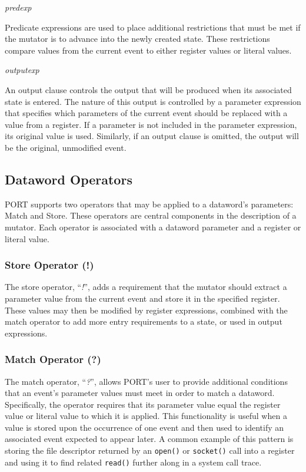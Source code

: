 \textit{predexp}

Predicate expressions are used to place additional restrictions that must
be met if the mutator is to advance into the newly created state.  These
restrictions compare values from the current event to either register
values or literal values.

\textit{outputexp}

An output clause controls the output that will be produced when its
associated state is entered.  The nature of this output is controlled by a
parameter expression that specifies which parameters of the current event
should be replaced with a value from a register.  If a parameter is not
included in the parameter expression, its original value is used.
Similarly,
if an output clause is omitted, the output will be the
original, unmodified event.

\subsection{Dataword Operators}
\label{sub:DatawordOperators}

PORT supports two operators that may be applied to a dataword's
parameters: Match and Store.  These operators are central components in
the description of a mutator.  Each operator is associated with a dataword
parameter and a register or literal value.

\subsubsection{Store Operator (!)}

The store operator, ``\textit{!}'', adds a requirement that the
mutator should extract a parameter value from the current event and store
it in the specified register.  These values may then be modified by
register expressions, combined with the match operator to add more
entry requirements to a state, or used in output expressions.

\subsubsection{Match Operator (?)}

The match operator, ``\textit{?}'',
allows PORT's user
to provide additional conditions
that an event's parameter values must meet
in order to match a dataword.
Specifically,
the operator requires
that its parameter value equal the
register value
or literal value
to which it is applied.
This functionality is
useful when a value is stored upon the occurrence of one event
and then used to identify an associated event expected to appear later.
A common example of this pattern is storing the file descriptor
returned by an {\tt open()} or {\tt socket()} call into a register
and using it to find related {\tt read()} further along in a system call
trace.


